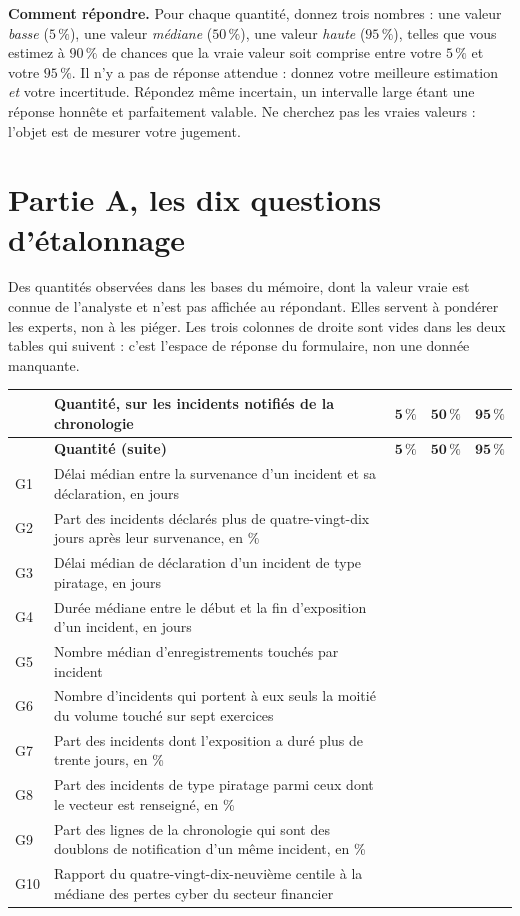 \begin{cle}
\textbf{Comment répondre.} Pour chaque quantité, donnez trois nombres : une valeur \emph{basse}
($5\,\%$), une valeur \emph{médiane} ($50\,\%$), une valeur \emph{haute} ($95\,\%$), telles que
vous estimez à $90\,\%$ de chances que la vraie valeur soit comprise entre votre $5\,\%$ et votre
$95\,\%$. Il n'y a pas de réponse attendue : donnez votre meilleure estimation \emph{et} votre
incertitude. Répondez même incertain, un intervalle large étant une réponse honnête et
parfaitement valable. Ne cherchez pas les vraies valeurs : l'objet est de mesurer votre jugement.
\end{cle}

\section*{Partie A, les dix questions d'étalonnage}

Des quantités observées dans les bases du mémoire, dont la valeur vraie est connue de l'analyste
et n'est pas affichée au répondant. Elles servent à pondérer les experts, non à les piéger. Les
trois colonnes de droite sont vides dans les deux tables qui suivent : c'est l'espace de réponse
du formulaire, non une donnée manquante.

{\small
\renewcommand{\arraystretch}{1.22}
\begin{longtable}{@{}l p{8.0cm} c c c@{}}
\toprule
& \textbf{Quantité, sur les incidents notifiés de la chronologie} & $\mathbf{5\,\%}$ &
$\mathbf{50\,\%}$ & $\mathbf{95\,\%}$ \\
\midrule
\endfirsthead
\toprule
& \textbf{Quantité (suite)} & $\mathbf{5\,\%}$ & $\mathbf{50\,\%}$ & $\mathbf{95\,\%}$ \\
\midrule
\endhead
G1 & Délai médian entre la survenance d'un incident et sa déclaration, en jours & & & \\
G2 & Part des incidents déclarés plus de quatre-vingt-dix jours après leur survenance,
     en \% & & & \\
G3 & Délai médian de déclaration d'un incident de type piratage, en jours & & & \\
G4 & Durée médiane entre le début et la fin d'exposition d'un incident, en jours & & & \\
G5 & Nombre médian d'enregistrements touchés par incident & & & \\
G6 & Nombre d'incidents qui portent à eux seuls la moitié du volume touché
     sur sept exercices & & & \\
G7 & Part des incidents dont l'exposition a duré plus de trente jours, en \% & & & \\
G8 & Part des incidents de type piratage parmi ceux dont le vecteur est renseigné,
     en \% & & & \\
G9 & Part des lignes de la chronologie qui sont des doublons de notification d'un même
     incident, en \% & & & \\
G10 & Rapport du quatre-vingt-dix-neuvième centile à la médiane des pertes cyber du
      secteur financier & & & \\
\bottomrule
\end{longtable}}

